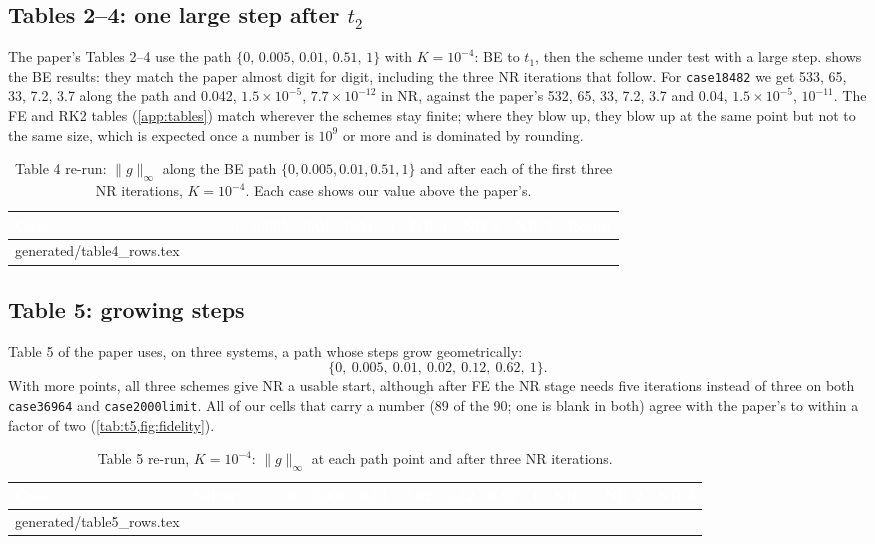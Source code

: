\documentclass[11pt,a4paper]{article}
\makeatletter
\newcommand{\thead}[1]{\textcolor{white}{\sffamily\bfseries\small #1}}
\newcommand{\headrow}{\rowcolor{navy}}
\newcommand{\rows}[1]{\@@input #1 }
\newcommand{\ninf}[1]{\lVert #1\rVert_\infty}
\newcommand{\code}[1]{\texttt{#1}}
\makeatother
\begin{document}
\subsection{Tables 2--4: one large step after $t_2$}
The paper's Tables 2--4 use the path $\{0,\,0.005,\,0.01,\,0.51,\,1\}$ with $K=10^{-4}$: BE to $t_1$, then
the scheme under test with a large step.  shows the BE results: they match the paper almost
digit for digit, including the three NR iterations that follow. For \code{case18482} we get 533, 65, 33,
7.2, 3.7 along the path and 0.042, $1.5\times10^{-5}$, $7.7\times10^{-12}$ in NR, against the paper's 532,
65, 33, 7.2, 3.7 and 0.04, $1.5\times10^{-5}$, $10^{-11}$. The FE and RK2 tables (\cref{app:tables}) match
wherever the schemes stay finite; where they blow up, they blow up at the same point but not to the same
size, which is expected once a number is $10^{9}$ or more and is dominated by rounding.

\begin{table}[!htbp]
\centering
\caption[Table 4 re-run: BE then NR]{Table 4 re-run: $\ninf{g}$ along the BE path $\{0,0.005,0.01,0.51,1\}$
and after each of the first three NR iterations, $K=10^{-4}$. Each case shows our value above the paper's.}
\label{tab:be}
\scriptsize
\setlength{\tabcolsep}{3.3pt}
\begin{tabular}{@{}l l r r r r r r r r l@{}}
\toprule
\headrow \thead{Case} & & \thead{$t{=}0$} & \thead{0.005} & \thead{0.01} & \thead{0.51} & \thead{1} & \thead{NR 1} & \thead{NR 2} & \thead{NR 3} & \thead{Result} \\
\midrule
\rows{generated/table4_rows.tex}
\bottomrule
\end{tabular}
\end{table}

\subsection{Table 5: growing steps}
Table 5 of the paper uses, on three systems, a path whose steps grow geometrically:
\[
  \{0,\ 0.005,\ 0.01,\ 0.02,\ 0.12,\ 0.62,\ 1\}.
\] With more points, all three schemes give NR a usable start, although after FE the
NR stage needs five iterations instead of three on both \code{case36964} and \code{case2000limit}. All of our cells
that carry a number (89 of the 90; one is blank in both) agree with the paper's to within a factor of two
(\cref{tab:t5,fig:fidelity}).

\begin{table}[!htbp]
\centering
\caption[Table 5 re-run: growing time steps]{Table 5 re-run, $K=10^{-4}$: $\ninf{g}$ at each path point and
after three NR iterations.}
\label{tab:t5}
\scriptsize
\setlength{\tabcolsep}{2.6pt}
\begin{tabular}{@{}l l l r r r r r r r r r r@{}}
\toprule
\headrow \thead{Case} & \thead{Solver} & & \thead{$t{=}0$} & \thead{0.005} & \thead{0.01} & \thead{0.02} & \thead{0.12} & \thead{0.62} & \thead{1} & \thead{NR 1} & \thead{NR 2} & \thead{NR 3} \\
\midrule
\rows{generated/table5_rows.tex}
\bottomrule
\end{tabular}
\end{table}
\end{document}
